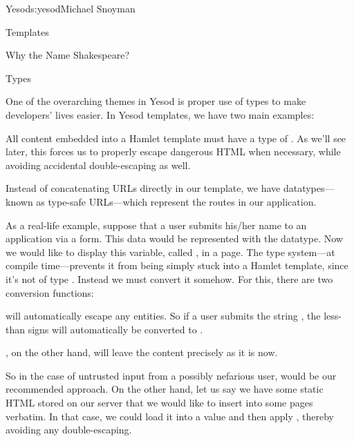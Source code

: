 \begin{aosachapter}{Yesod}{s:yesod}{Michael Snoyman}
\begin{aosasect1}{Templates}
\begin{aosabox}{Why the Name Shakespeare?}
\end{aosabox}

\begin{aosasect2}{Types}

One of the overarching themes in Yesod is proper use of types to make
developers' lives easier. In Yesod templates, we have two main
examples:

\begin{aosaenumerate}

\item All content embedded into a Hamlet template must have a type of
  . As we'll see later, this forces us to properly escape
  dangerous HTML when necessary, while avoiding accidental
  double-escaping as well.

\item Instead of concatenating URLs directly in our template, we have
  datatypes---known as type-safe URLs---which represent the routes in
  our application.

\end{aosaenumerate}

As a real-life example, suppose that a user submits his/her name to an
application via a form. This data would be represented with the 
datatype. Now we would like to display this variable, called
, in a page. The type system---at compile time---prevents
it from being simply stuck into a Hamlet template, since it's not of
type . Instead we must convert it somehow. For this, there are two
conversion functions:

\begin{aosaenumerate}

\item {} will automatically escape any entities. So if a user
  submits the string , the less-than signs will automatically be converted to \code{\&{\textless}}.

\item {}, on the other hand, will leave the content
  precisely as it is now.

\end{aosaenumerate}

So in the case of untrusted input from a possibly nefarious user,
 would be our recommended approach. On the other hand, let us
say we have some static HTML stored on our server that we would like
to insert into some pages verbatim. In that case, we could load it
into a  value and then apply , thereby
avoiding any double-escaping.


\end{aosasect2}
\end{aosasect1}
\end{aosachapter}
